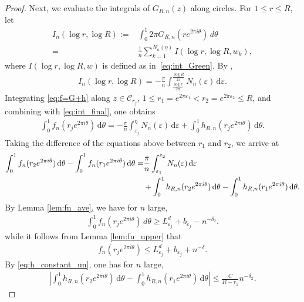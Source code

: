 \documentclass[11pt]{amsart}
\begin{document}
\begin{proof}
Next, we evaluate the integrals of $G_{R,n}(z)$ along circles.
For $1\leq r\leq R$, let
\begin{align*}
I_n(\log r, \log R):=&\int_0^{1} 2\pi G_{R,n}(r e^{2\pi i\theta})\, d\theta\\
=&\frac{1}{n}\sum_{k=1}^{N_n(\eta)} I(\log r, \log R, w_k),
\end{align*}
where $I(\log r,\log R, w)$ is defined as in~\eqref{eq:int_Green}.
By \cite[(4.24)]{HS2},  
\begin{align}\label{eq:int_final}
I_n(\log r, \log R)=-\frac{\pi}{n} \int_{\frac{\log r}{2\pi}}^{\frac{\log R}{2\pi}} N_n(\varepsilon)\, \mathrm{d}\varepsilon.
\end{align}
Integrating \eqref{eq:f=G+h} along $z\in \mathcal{C}_{r_j}$, $1\leq r_1=e^{2\pi\varepsilon_1}<r_2=e^{2\pi\varepsilon_2}\leq R$, and combining with \eqref{eq:int_final}, one obtains 
\begin{align*}
\int_0^{1} f_n(r_j e^{2\pi i\theta})\, \mathrm{d}\theta=-\frac{\pi}{n}\int_{\varepsilon_j}^{\eta} N_n(\varepsilon)\, \mathrm{d}\varepsilon+\int_0^{1} h_{R,n}(r_je^{2\pi i\theta})\, \mathrm{d}\theta.
\end{align*}
Taking the difference of the equations above between $r_1$ and $r_2$, we arrive at 
\begin{align}\label{eq:N_0'}
\int_0^{1} f_n(r_2 e^{2\pi i\theta})\, \mathrm{d}\theta-\int_0^{1} f_n(r_1e^{2\pi i\theta})\, \mathrm{d}\theta=&\frac{\pi}{n}\int_{\varepsilon_1}^{\varepsilon_2} N_n(\varepsilon)\, \mathrm{d}\varepsilon \notag\\
&+\int_0^1 h_{R,n}(r_2 e^{2\pi i \theta})\, \mathrm{d}\theta-\int_0^1 h_{R,n}(r_1 e^{2\pi i \theta})\, \mathrm{d}\theta.
\end{align}
By Lemma \ref{lem:fn_ave}, we have for $n$ large,
\begin{align}\label{eq:N_1'}
\int_0^{1} f_n(r_j e^{2\pi i\theta})\, d\theta\geq L^d_{\varepsilon_j}+b_{\varepsilon_j}-n^{-\delta_2}.
\end{align}
while it follows from  Lemma \ref{lem:fn_upper} that
\begin{align}\label{eq:N_2'}
f_n(r_j e^{2\pi i\theta})\leq L^d_{\varepsilon_j}+b_{\varepsilon_j}+n^{-\delta}.
\end{align}
By \eqref{eq:h_constant_un}, one has for $n$ large,
\begin{align}\label{eq:N_2''}
\left|\int_0^1 h_{R,n}(r_2 e^{2\pi i \theta})\, \mathrm{d}\theta-\int_0^1 h_{R,n}(r_1 e^{2\pi i \theta})\, \mathrm{d}\theta\right|\leq \frac{C}{R-r_2} n^{-\delta_2}.

\end{align}
\end{proof}
\end{document}

